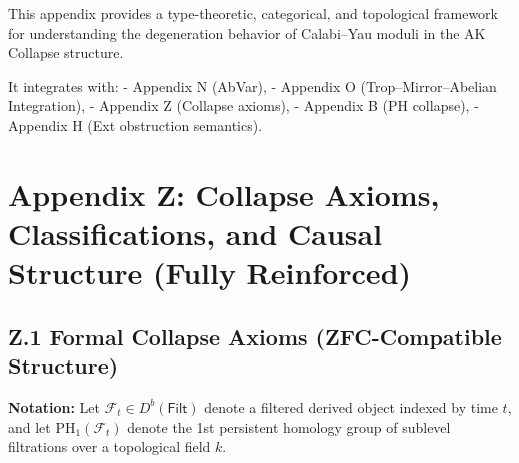 \documentclass[11pt]{article}
\begin{document}
\begin{axiom}
\begin{axiom}
{{This appendix provides a type-theoretic, categorical, and topological framework  
for understanding the degeneration behavior of Calabi–Yau moduli in the AK Collapse structure.

It integrates with:
- Appendix N (AbVar),
- Appendix O (Trop–Mirror–Abelian Integration),
- Appendix Z (Collapse axioms),
- Appendix B (PH collapse),
- Appendix H (Ext obstruction semantics).






\section*{Appendix Z: Collapse Axioms, Classifications, and Causal Structure (Fully Reinforced)}

\subsection*{Z.1 Formal Collapse Axioms (ZFC-Compatible Structure)}

\textbf{Notation:} Let \( \mathcal{F}_t \in D^b(\mathsf{Filt}) \) denote a filtered derived object indexed by time \( t \),  
and let \( \mathrm{PH}_1(\mathcal{F}_t) \) denote the 1st persistent homology group of sublevel filtrations over a topological field \( k \).  

}}
\end{axiom}
\end{axiom}
\end{document}
